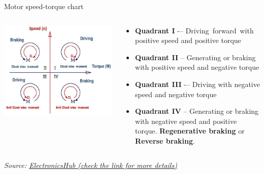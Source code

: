 \documentclass[compress]{beamer}
\newcommand{\source}[2]{{\tiny\it Source: \href{#1}{#2}}}
\begin{document}
\begin{frame}{Motor speed-torque chart}

    \begin{columns}
        \begin{column}{0.4\linewidth}
    \begin{center}
        \includegraphics[width=1.1\columnwidth]{four-quadrant}
    \end{center}
            
        \end{column}
        \begin{column}{0.6\linewidth}
    \begin{itemize}
        \item \textbf{Quadrant I} -– Driving forward with positive speed and positive torque
        \item \textbf{Quadrant II} -- Generating or braking with positive speed and negative torque
        \item \textbf{Quadrant III} -– Driving with negative speed and negative torque
        \item \textbf{Quadrant IV} -- Generating or braking with negative speed
            and positive torque. \textbf{Regenerative braking} or
            \textbf{Reverse braking}.

    \end{itemize}

        \end{column}
    \end{columns}


    \source{http://www.electronicshub.org/four-quadrant-operations-of-dc-motor/}{ElectronicsHub
    (check the link for more details)}
\end{frame}
\end{document}

